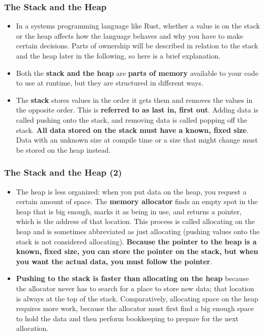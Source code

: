 \documentclass{beamer}
\begin{document}
	
	\begin{frame}[fragile]
		\frametitle{The Stack and the Heap}
		\begin{itemize}
			\item In a systems programming language like Rust, whether a value is on the stack or the heap affects how the language behaves and why you have to make certain decisions. Parts of ownership will be described in relation to the stack and the heap later in the following, so here is a brief explanation.
			\item 	Both the \textbf{stack and the heap} are \textbf{parts of memory} available to your code to use at runtime, but they are structured in different ways. 
			\item The \textbf{stack} stores values in the order it gets them and removes the values in the opposite order. This is \textbf{referred to as last in, first out}. Adding data is called pushing onto the stack, and removing data is called popping off the stack. \textbf{All data stored on the stack must have a known, fixed size}. Data with an unknown size at compile time or a size that might change must be stored on the heap instead.
		\end{itemize}
	\end{frame}
	
	\begin{frame}[fragile]
		\frametitle{The Stack and the Heap (2)}
		\begin{itemize}
			\item 	The heap is less organized: when you put data on the heap, you request a certain amount of space. The \textbf{memory allocator} finds an empty spot in the heap that is big enough, marks it as being in use, and returns a pointer, which is the address of that location. This process is called allocating on the heap and is sometimes abbreviated as just allocating (pushing values onto the stack is not considered allocating). \textbf{Because the pointer to the heap is a known, fixed size, you can store the pointer on the stack, but when you want the actual data, you must follow the pointer}.
			\item 	\textbf{Pushing to the stack is faster than allocating on the heap} because the allocator never has to search for a place to store new data; that location is always at the top of the stack. Comparatively, allocating space on the heap requires more work, because the allocator must first find a big enough space to hold the data and then perform bookkeeping to prepare for the next allocation.
			
		\end{itemize}
	\end{frame}
	
\end{document}
